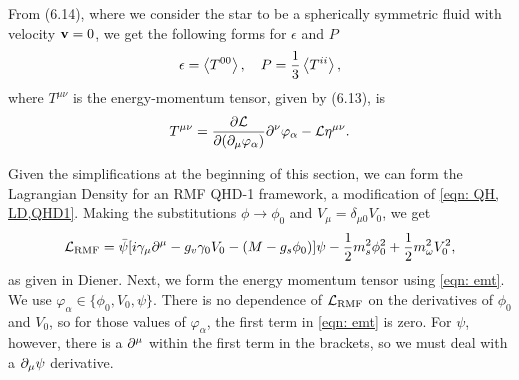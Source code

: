 From \autocite[p. 40]{diener_2008} (6.14), where we consider the star to be a spherically symmetric fluid with velocity $\vb{v}=0$, we get the following forms for $\epsilon$ and $P$
\begin{align}\label{eqn: eps and P defs}
    \epsilon = \expval{T^{00}}, \quad P = \frac{1}{3}\expval{T^{ii}},
\end{align}
where $T^{\mu\nu}$ is the energy-momentum tensor, given by \autocite[p. 40]{diener_2008} (6.13), is
\begin{align}\label{eqn: emt}
    T^{\mu\nu} = \pdv{\mathcal{L}}{(\partial_\mu \varphi_\alpha)}\partial^\nu \varphi_\alpha - \mathcal{L} \eta^{\mu\nu}.
\end{align}

Given the simplifications at the beginning of this section, we can form the Lagrangian Density for an RMF QHD-1 framework, a modification of \eqref{eqn: QH, LD,QHD1}. Making the substitutions $\phi\to \phi_0$ and $V_\mu = \delta_{\mu 0 } V_0$, we get
\begin{align}
    \Lag_\text{RMF} = \bar\psi \bqty{i\gamma_\mu\p^\mu - g_v \gamma_0 V_0 - (M-g_s\phi_0)} \psi - \frac{1}{2} m_s^2 \phi_0^2 + \frac{1}{2} m_\omega^2 V_0^2,
\end{align}
as given in Diener. Next, we form the energy momentum tensor using \eqref{eqn: emt}. We use $\varphi_\alpha \in \{ \phi_0, V_0, \psi\}$. There is no dependence of $\mathcal{L}_\text{RMF}$ on the derivatives of $\phi_0$ and $V_0$, so for those values of $\varphi_\alpha$, the first term in \eqref{eqn: emt} is zero. For $\psi$, however, there is a $\partial^\mu$ within the first term in the brackets, so we must deal with a $\partial_\mu \psi$ derivative. 

